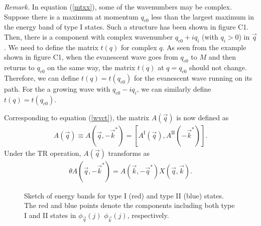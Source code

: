 \documentclass[aps,pra,amsmath,twocolumn,showpacs,bibnotes,10pt]{revtex4-1}
\begin{document}
{\it Remark.} In equation (\ref{mtxx}), some of the wavenumbers may be complex. Suppose there is a maximum at momentum $q_{c0}$ less than the largest maximum in the energy band of type I states. Such a structure has been shown in figure C1. Then, there is a component with complex wavenumber $q_{c0} + iq_i$ (with $q_i > 0$) in $\vec q$. We need to define the matrix $t(q)$ for complex $q$. As seen from the example shown in figure C1, when the evanescent wave goes from $q_{c0}$ to $M$ and then returns to $q_{c0}$ on the same way, the matrix $t(q)$ at $q=q_{c0}$ should not change. Therefore, we can define $t(q) = t(q_{c0})$ for the evanescent wave running on its path. For the a growing wave with $q_{c0} - iq_i$, we can similarly define $t(q) = t(q_{c0})$.

Corresponding to equation (\ref{wvct}), the matrix $A(\vec q)$ is now defined as 
\begin{eqnarray}
A(\vec q) \equiv A(\vec q,-\vec k^{\ast}) = [A^{\text{I}}(\vec q),A^{\text{II}}(-\vec k^{\ast})]. \label{eqa1}
\end{eqnarray}
Under the TR operation, $A(\vec q)$ transforms as 
\begin{eqnarray}
\theta A(\vec q, -\vec k^{\ast}) = A(\vec k,-\vec q^{\ast})X(\vec q,\vec k). \label{eqb2}
\end{eqnarray}

\begin{figure}[t]
\centerline{}
\caption{Sketch of energy bands for type I (red) and type II (blue) states. The red and blue points denote the components including both type I and II states in $\phi_{\vec q}(j)$ $\phi_{\vec k}(j)$, respectively.}
\end{figure}
  
\end{document}
